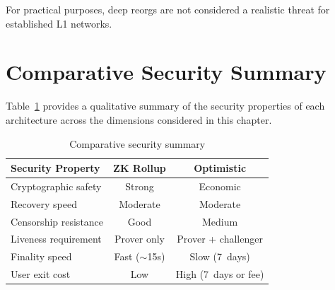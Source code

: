 For practical purposes, deep reorgs are not considered a realistic threat for established L1 networks.

\section{Comparative Security Summary}

Table~\ref{tab:security-summary} provides a qualitative summary of the security properties of each architecture across the dimensions considered in this chapter.

\begin{table}[h]
    \centering
    \begin{tabular}{l|c|c}
        \hline
        \textbf{Security Property} & \textbf{ZK Rollup} & \textbf{Optimistic} \\
        \hline
        Cryptographic safety & Strong & Economic \\
        \hline
        Recovery speed & Moderate & Moderate \\
        \hline
        Censorship resistance & Good & Medium \\
        \hline
        Liveness requirement & Prover only & Prover + challenger \\
        \hline
        Finality speed & Fast ($\sim$15s) & Slow (7~days) \\
        \hline
        User exit cost & Low & High (7~days or fee) \\
        \hline
    \end{tabular}
    \caption{Comparative security summary}
    \label{tab:security-summary}
\end{table}
